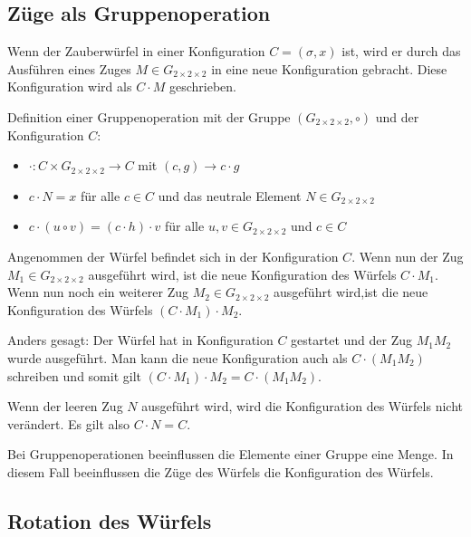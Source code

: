 \documentclass[12pt,a4paper, usenames, dvipsnames]{article}
\newcommand{\Gtwo}{\ensuremath{G_{2\times 2\times 2}}}
\begin{document}
%
%
%
%
%
%
%
%
%
%
%
%
%
%
%
%
%
%
%
%
\subsection*{Züge als Gruppenoperation}

Wenn der Zauberwürfel in einer Konfiguration $C=(\sigma, x)$ ist, wird er durch das Ausführen eines Zuges $M \in \Gtwo$ in eine neue Konfiguration gebracht. Diese Konfiguration wird als $C \cdot M$ geschrieben. 


Definition einer Gruppenoperation mit der Gruppe $(\Gtwo, \circ)$ und der Konfiguration $C$:
\begin{itemize}
\item $\cdot: C \times \Gtwo \rightarrow C$ mit $(c, g) \rightarrow c \cdot g $
\item $c \cdot N = x$ für alle $c \in C$ und das neutrale Element $N \in \Gtwo$  
\item $c \cdot (u \circ v) = (c \cdot h) \cdot v$ für alle $u, v \in \Gtwo$ und $c \in C$
\end{itemize}


Angenommen der Würfel befindet sich in der Konfiguration $C$. Wenn nun der Zug $M_1 \in \Gtwo$ ausgeführt wird, ist die neue Konfiguration des Würfels $C \cdot M_1$. Wenn nun noch ein weiterer Zug $M_2 \in \Gtwo$ ausgeführt wird,ist die neue Konfiguration des Würfels $(C \cdot M_1) \cdot M_2$. 


Anders gesagt: Der Würfel hat in Konfiguration $C$ gestartet und der Zug $M_1 M_2$ wurde ausgeführt. Man kann die neue Konfiguration auch als $C \cdot (M_1 M_2)$ schreiben und somit gilt $(C \cdot M_1) \cdot M_2 = C \cdot (M_1 M_2)$. 


Wenn der leeren Zug $N$ ausgeführt wird, wird die Konfiguration des Würfels nicht verändert. Es gilt also $C \cdot N = C$. 


Bei Gruppenoperationen beeinflussen die Elemente einer Gruppe eine Menge. In diesem Fall beeinflussen die Züge des Würfels die Konfiguration des Würfels. 

%
%
%
%
%
%
%
%
%
%
%
%
%
%
%
%
%
%
%
%
\subsection*{Rotation des Würfels}
\end{document}

